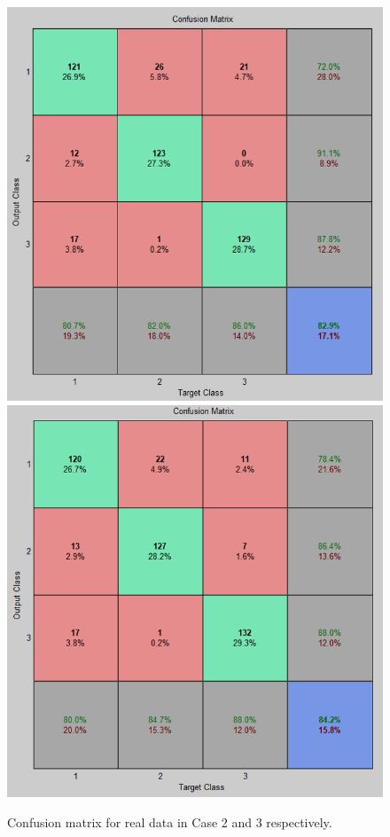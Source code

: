 \documentclass[10pt]{report}
\begin{document}
\begin{figure}[!htb]
  \includegraphics[width=\linewidth]{conf_real_case2.png}
\endminipage\hfill
{}
  \includegraphics[width=\linewidth]{conf_real_case3.png}
\endminipage\hfill
\caption{Confusion matrix for real data in Case 2 and 3 respectively.}
\end{figure}
\end{document}
